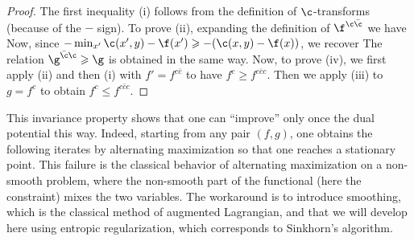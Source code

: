 \begin{proof} The first inequality (i) follows from the definition of $\c$-transforms (because of the $-$ sign). To prove (ii), expanding the definition of $\f^{\c\bar{\c}}$ we have
Now, since $-\min_{x'} \c(x',y) - \f(x') \geq -(\c(x,y)-\f(x))$, we recover 
The relation $\g^{\bar{\c}\c} \geq \g$ is obtained in the same way. 
%
Now, to prove (iv), we first apply (ii) and then (i) with $f'=f^{c\bar c}$ to have $f^c \geq f^{c \bar c c}$.
Then we apply (iii) to $g=f^c$ to obtain $f^c \leq f^{c\bar c c}$. 
\end{proof}

This invariance property shows that one can ``improve'' only once the dual potential this way. Indeed, starting from any pair $(f,g)$, one obtains the following iterates by alternating maximization
so that one reaches a stationary point. 
%
This failure is the classical behavior of alternating maximization on a non-smooth problem, where the non-smooth part of the functional (here the constraint) mixes the two variables. 
% 
The workaround is to introduce smoothing, which is the classical method of augmented Lagrangian, and that we will develop here using entropic regularization, which corresponds to Sinkhorn's algorithm. 



  
  